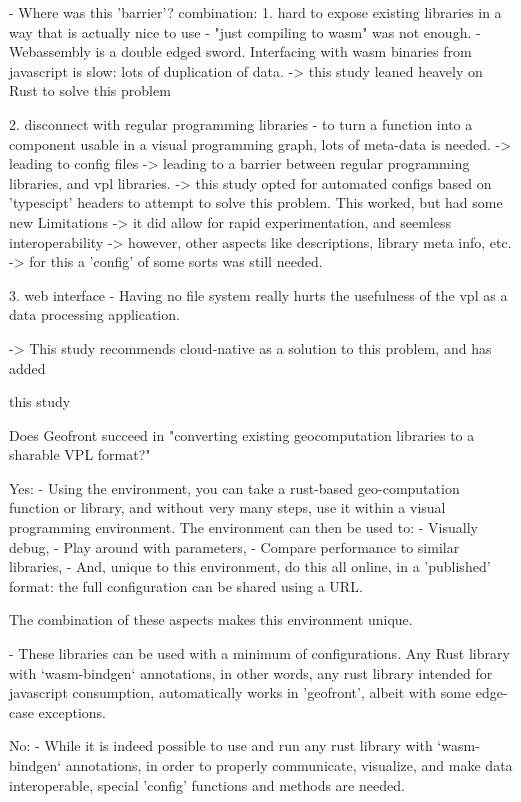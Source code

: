 \begin{note}
  
- Where was this 'barrier'?
combination: 
1. hard to expose existing libraries in a way that is actually nice to use
- "just compiling to wasm" was not enough.
- Webassembly is a double edged sword. Interfacing with wasm binaries from javascript is slow: lots of duplication of data. 
-> this study leaned heavely on Rust to solve this problem

2. disconnect with regular programming libraries
- to turn a function into a component usable in a visual programming graph, lots of meta-data is needed. 
  -> leading to config files 
  -> leading to a barrier between regular programming libraries, and vpl libraries. 
  -> this study opted for automated configs based on 'typescipt' headers to attempt to solve this problem. This worked, but had some new Limitations
     -> it did allow for rapid experimentation, and seemless interoperability
     -> however, other aspects like descriptions, library meta info, etc. 
     -> for this a 'config' of some sorts was still needed. 

3. web interface
- Having no file system really hurts the usefulness of the vpl as a data processing application.

-> This study recommends cloud-native as a solution to this problem, and has added 


this study 



Does Geofront succeed in "converting existing geocomputation libraries to a sharable VPL format?" 

Yes: 
 - Using the environment, you can take a rust-based geo-computation function or library, 
   and without very many steps, use it within a visual programming environment. 
   The environment can then be used to:
   - Visually debug, 
   - Play around with parameters, 
   - Compare performance to similar libraries,
   - And, unique to this environment, do this all online, in a 'published' format: the full configuration can be shared using a URL. 

   The combination of these aspects makes this environment unique. 

- These libraries can be used with a minimum of configurations. Any Rust library with `wasm-bindgen` annotations, in other words, any rust library intended for javascript consumption, automatically works in 'geofront', albeit with some edge-case exceptions. 


No: 
 - While it is indeed possible to use and run any rust library with `wasm-bindgen` annotations, in order to properly communicate, visualize, and make data interoperable, special 'config' functions and methods are needed. 


\end{note}
